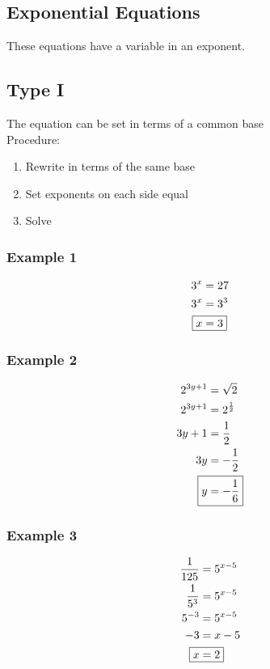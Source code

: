 \documentclass{amsart}
\author{Phil Huffman}
\date{\today}
\begin{document}
\bigskip
\begin{footnotesize}
\begin{multicols}{4}
\section*{Exponential Equations}
These equations have a variable in an exponent.
\subsection*{Type I}
The equation can be set in terms of a common base\\
Procedure:
\begin{enumerate}
\item Rewrite in terms of the same base
\item Set exponents on each side equal
\item Solve 
\end{enumerate}
\subsubsection*{Example 1}
\begin{align*}
3^{x}&=27\\
3^{x}&=3^{3}\\
\Aboxed{x&=3}
\end{align*}
\subsubsection*{Example 2}
\begin{align*}
2^{3y+1}&=\sqrt{2}\\
2^{3y+1}&=2^{\frac{1}{2}}\\
3y+1&=\frac{1}{2}\\
3y&=-\frac{1}{2}\\
\Aboxed{y&=-\frac{1}{6}}
\end{align*}
\subsubsection*{Example 3}
\begin{align*}
\frac{1}{125}&=5^{x-5}\\
\frac{1}{5^{3}}&=5^{x-5}\\
5^{-3}&=5^{x-5}\\
-3&=x-5\\
\Aboxed{x&=2}
\end{align*}
\vspace{1cm}


\end{multicols}
\end{footnotesize}
\end{document}
